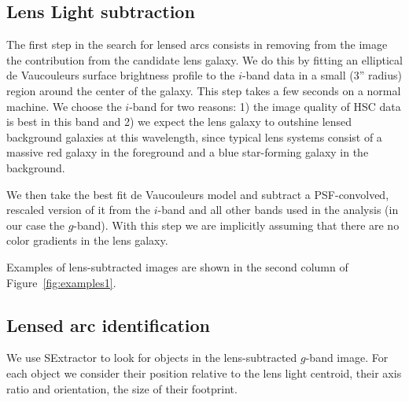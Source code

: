 \documentclass[a4paper,fleqn,usenatbib]{mnras}
\def\Fref#1{Figure~\ref{#1}\xspace}
\begin{document}
\subsection{Lens Light subtraction}

The first step in the search for lensed arcs consists in removing from the image the contribution from the candidate lens galaxy.
We do this by fitting an elliptical de Vaucouleurs surface brightness profile \citep{deV48} to the $i$-band data in a small (3'' radius) region around the center of the galaxy. 
This step takes a few seconds on a normal machine.
We choose the $i$-band for two reasons: 1) the image quality of HSC data is best in this band and 2) we expect the lens galaxy to outshine lensed background galaxies at this wavelength, since typical lens systems consist of a massive red galaxy in the foreground and a blue star-forming galaxy in the background.

We then take the best fit de Vaucouleurs model and subtract a PSF-convolved, rescaled version of it from the $i$-band and all other bands used in the analysis (in our case the $g$-band). 
With this step we are implicitly assuming that there are no color gradients in the lens galaxy.

Examples of lens-subtracted images are shown in the second column of \Fref{fig:examples1}.

\subsection{Lensed arc identification}\label{ssec:arc}

We use SExtractor to look for objects in the lens-subtracted $g$-band image.
For each object we consider their position relative to the lens light centroid, their axis ratio and orientation, the size of their footprint. 

\end{document}
